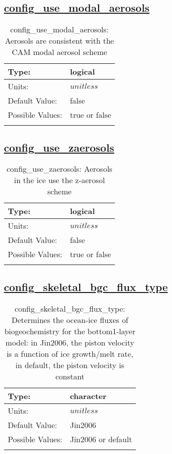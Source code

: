 \subsection[config\_use\_modal\_aerosols]{\hyperref[sec:nm_tab_biogeochemistry]{config\_use\_modal\_aerosols}}
\label{subsec:nm_sec_config_use_modal_aerosols}
\begin{center}
\begin{longtable}{| p{2.0in} || p{4.0in} |}
    \hline
    Type: & logical \\
    \hline
    Units: & $unitless$ \\
    \hline
    Default Value: & false \\
    \hline
    Possible Values: & true or false \\
    \hline
    \caption{config\_use\_modal\_aerosols: Aerosols are consistent with the CAM modal aerosol scheme}
\end{longtable}
\end{center}
\subsection[config\_use\_zaerosols]{\hyperref[sec:nm_tab_biogeochemistry]{config\_use\_zaerosols}}
\label{subsec:nm_sec_config_use_zaerosols}
\begin{center}
\begin{longtable}{| p{2.0in} || p{4.0in} |}
    \hline
    Type: & logical \\
    \hline
    Units: & $unitless$ \\
    \hline
    Default Value: & false \\
    \hline
    Possible Values: & true or false \\
    \hline
    \caption{config\_use\_zaerosols: Aerosols in the ice use the z-aerosol scheme}
\end{longtable}
\end{center}
\subsection[config\_skeletal\_bgc\_flux\_type]{\hyperref[sec:nm_tab_biogeochemistry]{config\_skeletal\_bgc\_flux\_type}}
\label{subsec:nm_sec_config_skeletal_bgc_flux_type}
\begin{center}
\begin{longtable}{| p{2.0in} || p{4.0in} |}
    \hline
    Type: & character \\
    \hline
    Units: & $unitless$ \\
    \hline
    Default Value: & Jin2006 \\
    \hline
    Possible Values: & Jin2006 or default \\
    \hline
    \caption{config\_skeletal\_bgc\_flux\_type: Determines the ocean-ice fluxes of biogeochemistry for the bottom1-layer model: in Jin2006,    the piston velocity is a function of ice growth/melt rate, in default, the piston velocity    is constant}
\end{longtable}
\end{center}

